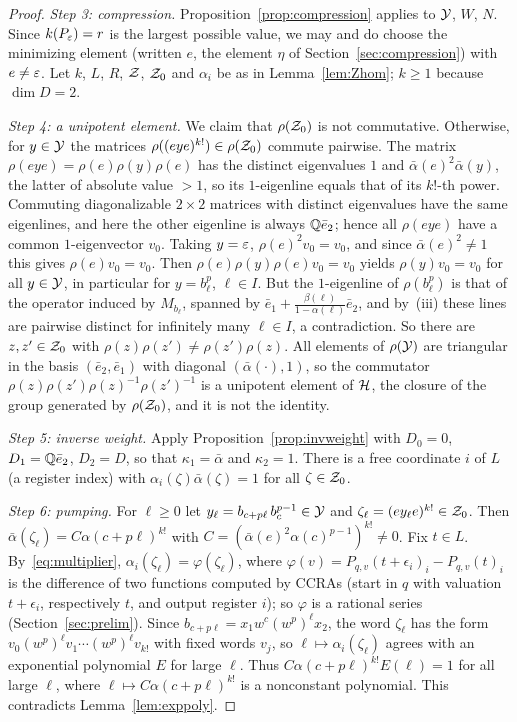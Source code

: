 \begin{proof}
\emph{Step 3: compression.} Proposition~\ref{prop:compression} applies to $\mathcal{Y}$, $W$, $N$. Since $k(P_\varepsilon)=r$ is the largest possible value, we may and do choose the minimizing element (written $e$, the element $\eta$ of Section~\ref{sec:compression}) with $e\ne\varepsilon$. Let $k$, $L$, $R$, $\mathcal{Z}$, $\mathcal{Z}_0$ and $\alpha_i$ be as in Lemma~\ref{lem:Zhom}; $k\ge1$ because $\dim D=2$.

\emph{Step 4: a unipotent element.} We claim that $\rho(\mathcal{Z}_0)$ is not commutative. Otherwise, for $y\in\mathcal{Y}$ the matrices $\rho((eye)^{k!})\in\rho(\mathcal{Z}_0)$ commute pairwise. The matrix $\rho(eye)=\rho(e)\rho(y)\rho(e)$ has the distinct eigenvalues $1$ and $\bar\alpha(e)^2\bar\alpha(y)$, the latter of absolute value $>1$, so its $1$-eigenline equals that of its $k!$-th power. Commuting diagonalizable $2\times2$ matrices with distinct eigenvalues have the same eigenlines, and here the other eigenline is always $\mathbb{Q}\bar e_2$; hence all $\rho(eye)$ have a common $1$-eigenvector $v_0$. Taking $y=\varepsilon$, $\rho(e)^2v_0=v_0$, and since $\bar\alpha(e)^2\ne1$ this gives $\rho(e)v_0=v_0$. Then $\rho(e)\rho(y)\rho(e)v_0=v_0$ yields $\rho(y)v_0=v_0$ for all $y\in\mathcal{Y}$, in particular for $y=b_\ell^p$, $\ell\in I$. But the $1$-eigenline of $\rho(b_\ell^p)$ is that of the operator induced by $M_{b_\ell}$, spanned by $\bar e_1+\frac{\beta(\ell)}{1-\alpha(\ell)}\bar e_2$, and by~(iii) these lines are pairwise distinct for infinitely many $\ell\in I$, a contradiction. So there are $z,z'\in\mathcal{Z}_0$ with $\rho(z)\rho(z')\ne\rho(z')\rho(z)$. All elements of $\rho(\mathcal{Y})$ are triangular in the basis $(\bar e_2,\bar e_1)$ with diagonal $(\bar\alpha(\cdot),1)$, so the commutator $\rho(z)\rho(z')\rho(z)^{-1}\rho(z')^{-1}$ is a unipotent element of $\mathcal{H}$, the closure of the group generated by $\rho(\mathcal{Z}_0)$, and it is not the identity.

\emph{Step 5: inverse weight.} Apply Proposition~\ref{prop:invweight} with $D_0=0$, $D_1=\mathbb{Q}\bar e_2$, $D_2=D$, so that $\kappa_1=\bar\alpha$ and $\kappa_2=1$. There is a free coordinate $i$ of $L$ (a register index) with $\alpha_i(\zeta)\bar\alpha(\zeta)=1$ for all $\zeta\in\mathcal{Z}_0$.

\emph{Step 6: pumping.} For $\ell\ge0$ let $y_\ell=b_{c+p\ell}\,b_c^{p-1}\in\mathcal{Y}$ and $\zeta_\ell=(ey_\ell e)^{k!}\in\mathcal{Z}_0$. Then $\bar\alpha(\zeta_\ell)=C\alpha(c+p\ell)^{k!}$ with $C=(\bar\alpha(e)^2\alpha(c)^{p-1})^{k!}\ne0$. Fix $t\in L$. By~\eqref{eq:multiplier}, $\alpha_i(\zeta_\ell)=\varphi(\zeta_\ell)$, where $\varphi(v)=P_{q,v}(t+\epsilon_i)_i-P_{q,v}(t)_i$ is the difference of two functions computed by CCRAs (start in $q$ with valuation $t+\epsilon_i$, respectively $t$, and output register $i$); so $\varphi$ is a rational series (Section~\ref{sec:prelim}). Since $b_{c+p\ell}=x_1w^c(w^p)^\ell x_2$, the word $\zeta_\ell$ has the form $v_0(w^p)^\ell v_1\cdots(w^p)^\ell v_{k!}$ with fixed words $v_j$, so $\ell\mapsto\alpha_i(\zeta_\ell)$ agrees with an exponential polynomial $E$ for large $\ell$. Thus $C\alpha(c+p\ell)^{k!}E(\ell)=1$ for all large $\ell$, where $\ell\mapsto C\alpha(c+p\ell)^{k!}$ is a nonconstant polynomial. This contradicts Lemma~\ref{lem:exppoly}.
\end{proof}

